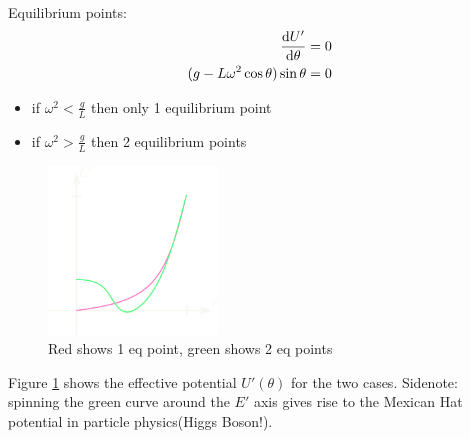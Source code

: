 \documentclass[../main.tex]{subfiles}
\begin{document}
\paragraph*{} Equilibrium points:
\begin{align*}
    \dv{U'}{\theta} = 0 \\
    (g - L \omega^2 \cos\theta) \sin\theta = 0
\end{align*}
\begin{itemize}
    \item if $\omega^2 < \frac{g}{L}$ then only 1 equilibrium point 
    \item if $\omega^2 > \frac{g}{L}$ then 2 equilibrium points
\end{itemize}
\begin{figure}[ht]
    \centering
    \includegraphics[width=0.4\textwidth]{mexicanhat.png}
    \caption{Red shows 1 eq point, green shows 2 eq points}
    \label{fig:mexicanhat}
\end{figure}
Figure \ref{fig:mexicanhat} shows the effective potential $U'(\theta)$ for the two cases. Sidenote:
spinning the green curve around the $E'$ axis gives rise to the Mexican Hat potential in particle
physics(Higgs Boson!). 
\end{document}
